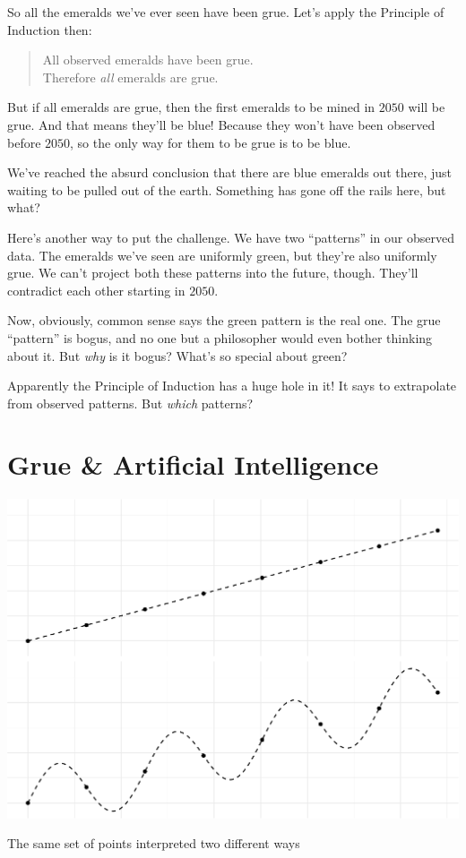 \documentclass[justified]{tufte-book}
\newenvironment{argument}{\begin{quote}\normalsize}{\end{quote}}
\theoremstyle{definition}
\theoremstyle{definition}
\theoremstyle{definition}
\theoremstyle{remark}
\begin{document}
So all the emeralds we've ever seen have been grue. Let's apply the
Principle of Induction then:

\begin{argument}
All observed emeralds have been grue.\\
Therefore \emph{all} emeralds are grue.
\end{argument}

But if all emeralds are grue, then the first emeralds to be mined in
\(2050\) will be grue. And that means they'll be blue! Because they
won't have been observed before \(2050\), so the only way for them to be
grue is to be blue.

We've reached the absurd conclusion that there are blue emeralds out
there, just waiting to be pulled out of the earth. Something has gone
off the rails here, but what?

Here's another way to put the challenge. We have two ``patterns'' in our
observed data. The emeralds we've seen are uniformly green, but they're
also uniformly grue. We can't project both these patterns into the
future, though. They'll contradict each other starting in \(2050\).

Now, obviously, common sense says the green pattern is the real one. The
grue ``pattern'' is bogus, and no one but a philosopher would even
bother thinking about it. But \emph{why} is it bogus? What's so special
about green?

Apparently the Principle of Induction has a huge hole in it! It says to
extrapolate from observed patterns. But \emph{which} patterns?

\hypertarget{grue-artificial-intelligence}{%
\section*{Grue \& Artificial
Intelligence}\label{grue-artificial-intelligence}}

\begin{marginfigure}
\includegraphics{_main_files/figure-latex/curvefitting-1} \caption[The same set of points interpreted two different ways]{The same set of points interpreted two different ways}\label{fig:curvefitting}
\end{marginfigure}
\end{document}
